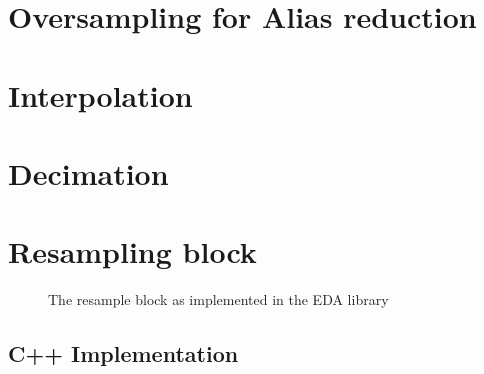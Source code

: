 \section{Oversampling for Alias reduction}
\section{Interpolation}
\section{Decimation}
\section{Resampling block}


\begin{figure}[H]
  \centering
  \label{fig:block_resample}
  
  \caption{The resample block as implemented in the EDA library}
\end{figure}

\subsection{C++ Implementation}
